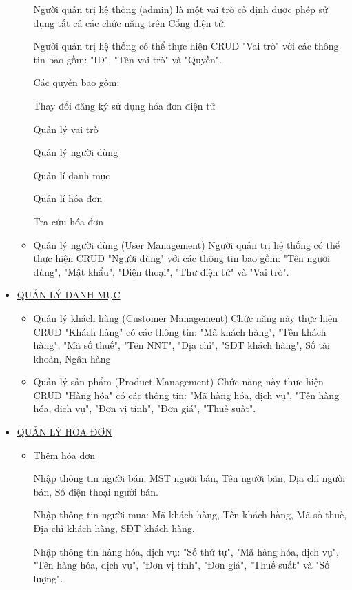 \begin{itemize}
\begin{itemize}
Người quản trị hệ thống (admin) là một vai trò cố định được phép sử dụng tất cả các chức năng trên Cổng điện tử.

Người quản trị hệ thống có thể thực hiện CRUD "Vai trò" với các thông tin bao gồm: "ID", "Tên vai trò" và "Quyền".

Các quyền bao gồm:

Thay đổi đăng ký sử dụng hóa đơn điện tử

Quản lý vai trò

Quản lý người dùng

Quản lí danh mục

Quản lí hóa đơn

Tra cứu hóa đơn
\item Quản lý người dùng (User Management)
Người quản trị hệ thống có thể thực hiện CRUD "Người dùng" với các thông tin bao gồm: "Tên người dùng", "Mật khẩu", "Điện thoại", "Thư điện tử" và "Vai trò".

\end{itemize}

\item \underline{\textsc{QUẢN LÝ DANH MỤC}}

\begin{itemize}

\item Quản lý khách hàng (Customer Management)
Chức năng này thực hiện CRUD "Khách hàng" có các thông tin: "Mã khách hàng", "Tên khách hàng", "Mã số thuế", "Tên NNT", "Địa chỉ", "SĐT khách hàng", Số tài khoản, Ngân hàng

\item Quản lý sản phẩm (Product Management)
Chức năng này thực hiện CRUD "Hàng hóa" có các thông tin: "Mã hàng hóa, dịch vụ", "Tên hàng hóa, dịch vụ", "Đơn vị tính", "Đơn giá", "Thuế suất".

\end{itemize}

\item \underline{\textsc{QUẢN LÝ HÓA ĐƠN}}

\begin{itemize}

\item Thêm hóa đơn

Nhập thông tin người bán: MST người bán, Tên người bán, Địa chỉ người bán, Số điện thoại người bán.

Nhập thông tin người mua: Mã khách hàng, Tên khách hàng, Mã số thuế, Địa chỉ khách hàng, SĐT khách hàng.

Nhập thông tin hàng hóa, dịch vụ: "Số thứ tự", "Mã hàng hóa, dịch vụ", "Tên hàng hóa, dịch vụ", "Đơn vị tính", "Đơn giá", "Thuế suất" và "Số lượng".


\end{itemize}
\end{itemize}
